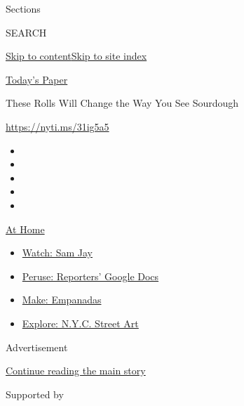Sections

SEARCH

\protect\hyperlink{site-content}{Skip to
content}\protect\hyperlink{site-index}{Skip to site index}

\href{https://myaccount.nytimes.com/auth/login?response_type=cookie\&client_id=vi}{}

\href{https://www.nytimes.com/section/todayspaper}{Today's Paper}

These Rolls Will Change the Way You See Sourdough

\href{https://nyti.ms/31ig5a5}{https://nyti.ms/31ig5a5}

\begin{itemize}
\item
\item
\item
\item
\item
\end{itemize}

\href{https://www.nytimes.com/spotlight/at-home?action=click\&pgtype=Article\&state=default\&region=TOP_BANNER\&context=at_home_menu}{At
Home}

\begin{itemize}
\tightlist
\item
  \href{https://www.nytimes.com/2020/08/04/arts/television/sam-jay-netflix-special.html?action=click\&pgtype=Article\&state=default\&region=TOP_BANNER\&context=at_home_menu}{Watch:
  Sam Jay}
\item
  \href{https://www.nytimes.com/interactive/2020/at-home/even-more-reporters-editors-diaries-lists-recommendations.html?action=click\&pgtype=Article\&state=default\&region=TOP_BANNER\&context=at_home_menu}{Peruse:
  Reporters' Google Docs}
\item
  \href{https://www.nytimes.com/2020/08/04/dining/colombian-empanadas-carlos-gaviria.html?action=click\&pgtype=Article\&state=default\&region=TOP_BANNER\&context=at_home_menu}{Make:
  Empanadas}
\item
  \href{https://www.nytimes.com/2020/08/06/arts/design/street-art-nyc-george-floyd.html?action=click\&pgtype=Article\&state=default\&region=TOP_BANNER\&context=at_home_menu}{Explore:
  N.Y.C. Street Art}
\end{itemize}

Advertisement

\protect\hyperlink{after-top}{Continue reading the main story}

Supported by

